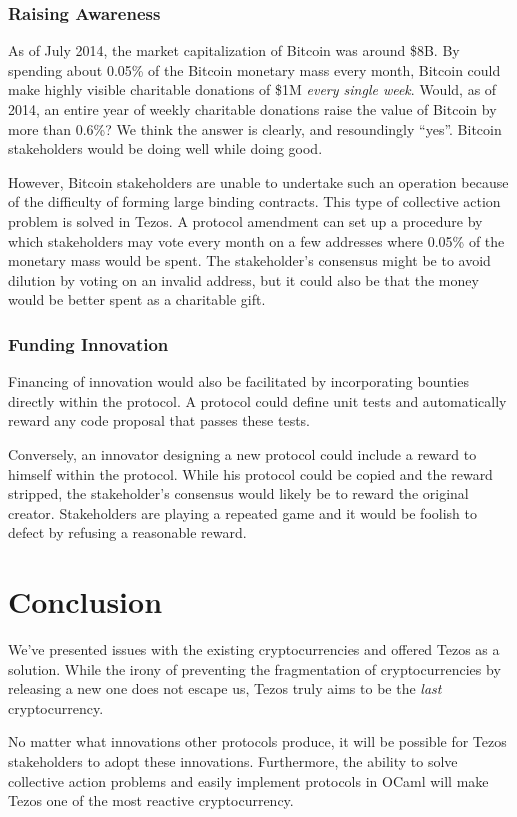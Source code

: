 \documentclass[letterpaper]{article}
\begin{document}
\subsubsection{Raising Awareness}

As of July 2014, the market capitalization of Bitcoin was around \$8B.
By spending about 0.05\% of the Bitcoin monetary mass every month,
Bitcoin could make highly visible
charitable donations of \$1M \emph{every single week}.
Would, as of 2014, an entire year of weekly charitable donations
raise the value of Bitcoin by more than 0.6\%?
We think the answer is clearly, and resoundingly ``yes''.
Bitcoin stakeholders would be doing well while doing good.

However, Bitcoin stakeholders are unable to undertake such an operation
because of the difficulty of forming large binding contracts. This type
of collective action problem is solved in Tezos.
A protocol amendment can set up a procedure by which
stakeholders may vote every month on a few addresses
where 0.05\% of the monetary mass would be spent.
The stakeholder's consensus might be to avoid dilution
by voting on an invalid address,
but it could also be that the money would be better spent as a charitable gift.

\subsubsection{Funding Innovation}

Financing of innovation would also be facilitated
by incorporating bounties directly within the protocol.
A protocol could define unit tests and automatically reward
any code proposal that passes these tests.

Conversely, an innovator designing a new protocol
could include a reward to himself within the protocol.
While his protocol could be copied and the reward stripped,
the stakeholder's consensus would likely be to reward the original creator.
Stakeholders are playing a repeated game
and it would be foolish to defect by refusing a reasonable reward.


\section*{Conclusion}

We've presented issues with the existing cryptocurrencies
and offered Tezos as a solution.
While the irony of preventing the fragmentation of cryptocurrencies
by releasing a new one does not escape us, %
Tezos truly aims to be the \emph{last} cryptocurrency.

No matter what innovations other protocols produce,
it will be possible for Tezos stakeholders to adopt these innovations.
Furthermore, the ability to solve collective action problems
and easily implement protocols in OCaml will make Tezos one of the most reactive cryptocurrency.



\end{document}
